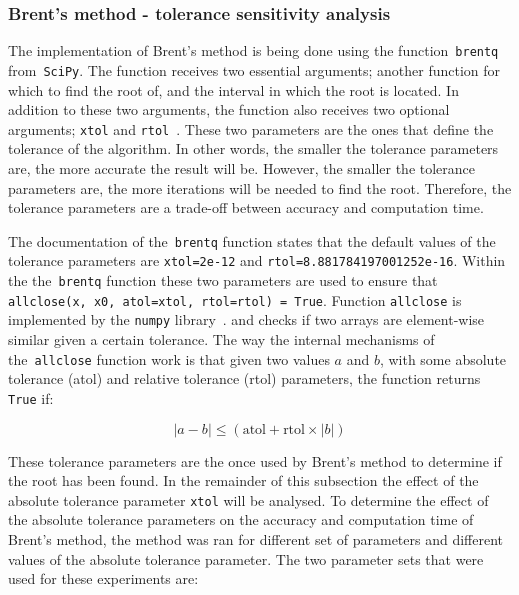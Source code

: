 \subsubsection{Brent's method - tolerance sensitivity analysis}
\label{sec:brent_tolerance}

The implementation of Brent's method is being done using the
function~\lstinline[style=pystyle]{brentq}
from~\lstinline[style=pystyle]{SciPy}.
The function receives two essential arguments; another function for
which to find the root of, and the interval in which the root is located.
In addition to these two arguments, the function also receives two optional
arguments; \lstinline[style=pystyle]{xtol} and
\lstinline[style=pystyle]{rtol}~\cite{2020SciPy-NMeth}.
These two parameters are the ones that define the tolerance of the algorithm.
In other words, the smaller the tolerance parameters are, the more accurate
the result will be.
However, the smaller the tolerance parameters are, the more iterations will
be needed to find the root.
Therefore, the tolerance parameters are a trade-off between accuracy and
computation time.

The documentation of the~\lstinline[style=pystyle]{brentq} function states
that the default values of the tolerance parameters are
\lstinline[style=pystyle]{xtol=2e-12} and
\lstinline[style=pystyle]{rtol=8.881784197001252e-16}.
Within the the~\lstinline[style=pystyle]{brentq} function these two parameters
are used to ensure that
\lstinline[style=pystyle]{allclose(x, x0, atol=xtol, rtol=rtol) = True}.
Function \lstinline[style=pystyle]{allclose} is implemented by the
\lstinline[style=pystyle]{numpy} library~\cite{2020NumPy-Array}.
and checks if two arrays are element-wise similar given a certain tolerance.
The way the internal mechanisms of the~\lstinline[style=pystyle]{allclose}
function work is that given two values \(a\) and \(b\), with some absolute
tolerance (atol) and relative tolerance (rtol) parameters, the function returns
\lstinline[style=pystyle]{True} if:

\begin{equation}
    |a - b| \leq (\text{atol} + \text{rtol} \times |b|)
\end{equation}

These tolerance parameters are the once used by Brent's method to determine
if the root has been found.
In the remainder of this subsection the effect of the absolute tolerance
parameter \lstinline[style=pystyle]{xtol} will be analysed.
To determine the effect of the absolute tolerance parameters on the accuracy and
computation time of Brent's method, the method was ran for different set of
parameters and different values of the absolute tolerance parameter.
The two parameter sets that were used for these experiments are:

